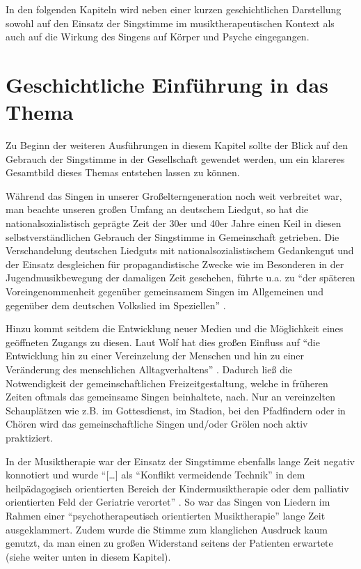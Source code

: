 In den folgenden Kapiteln wird neben einer kurzen geschichtlichen Darstellung sowohl auf den Einsatz der Singstimme im musiktherapeutischen Kontext als auch auf die Wirkung des Singens auf Körper und Psyche eingegangen.

\section{Geschichtliche Einführung in das Thema}
Zu Beginn der weiteren Ausführungen in diesem Kapitel sollte der Blick auf den Gebrauch der Singstimme in der Gesellschaft gewendet werden, um ein klareres Gesamtbild dieses Themas entstehen lassen zu können.

Während das Singen in unserer Großelterngeneration noch weit verbreitet war, man beachte unseren großen Umfang an deutschem Liedgut, so hat die nationalsozialistisch geprägte Zeit der 30er und 40er Jahre einen Keil in diesen selbstverständlichen Gebrauch der Singstimme in Gemeinschaft getrieben.
Die Verschandelung deutschen Liedguts mit nationalsozialistischem Gedankengut und der Einsatz desgleichen für propagandistische Zwecke wie im Besonderen in der Jugendmusikbewegung der damaligen Zeit geschehen, führte u.a. zu "`der späteren Voreingenommenheit gegenüber gemeinsamem Singen im Allgemeinen und gegenüber dem deutschen Volkslied im Speziellen"' \autocite[9]{wolf2012}.

Hinzu kommt seitdem die Entwicklung neuer Medien und die Möglichkeit eines geöffneten Zugangs zu diesen. Laut Wolf hat dies großen Einfluss auf "`die Entwicklung hin zu einer Vereinzelung der Menschen und hin zu einer Veränderung des menschlichen Alltagverhaltens"' \autocite[10]{wolf2012}. Dadurch ließ die Notwendigkeit der gemeinschaftlichen Freizeitgestaltung, welche in früheren Zeiten oftmals das gemeinsame Singen beinhaltete, nach. Nur an vereinzelten Schauplätzen wie z.B. im Gottesdienst, im Stadion, bei den Pfadfindern oder in Chören wird das gemeinschaftliche Singen und/oder Grölen noch aktiv praktiziert.

In der Musiktherapie war der Einsatz der Singstimme ebenfalls lange Zeit negativ konnotiert und wurde "`[\ldots] als "`Konflikt vermeidende Technik"' in dem heilpädagogisch orientierten Bereich der Kindermusiktherapie oder dem palliativ orientierten Feld der Geriatrie verortet"' \autocite[10]{wolf2012}. So war das Singen von Liedern im Rahmen einer "`psychotherapeutisch orientierten Musiktherapie"' lange Zeit ausgeklammert. Zudem wurde die Stimme zum klanglichen Ausdruck kaum genutzt, da man einen zu großen Widerstand seitens der Patienten erwartete (siehe weiter unten in diesem Kapitel). 

